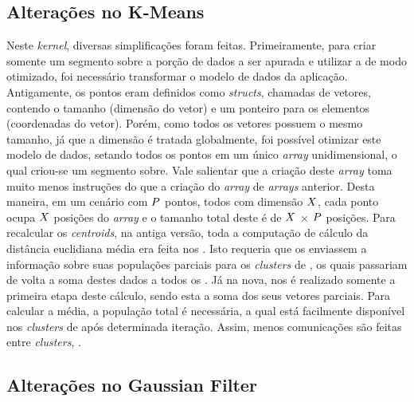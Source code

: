 \documentclass[a4paper,11pt]{article}
\begin{document}
\subsection{Alterações no K-Means}

Neste \textit{kernel}, diversas simplificações foram feitas. Primeiramente, para criar somente um segmento sobre a porção de dados a ser apurada e utilizar a \async de modo otimizado, foi necessário transformar o modelo de dados da aplicação. Antigamente, os pontos eram definidos como \textit{structs}, chamadas de vetores, contendo o tamanho (dimensão do vetor) e um ponteiro para os elementos (coordenadas do vetor). Porém, como todos os vetores possuem o mesmo tamanho, já que a dimensão é tratada globalmente, foi possível otimizar este modelo de dados, setando todos os pontos em um único \textit{array} unidimensional, o qual criou-se um segmento sobre. Vale salientar que a criação deste \textit{array} toma muito menos instruções do que a criação do \textit{array} de \textit{arrays} anterior. Desta maneira, em um cenário com $\mathnormal{P}$ pontos, todos com dimensão $\mathnormal{X}$, cada ponto ocupa $\mathnormal{X}$ posições do \textit{array} e o tamanho total deste é de $\mathnormal{X}$ $\times$ $\mathnormal{P}$ posições. Para recalcular os \textit{centroids}, na antiga versão, toda a computação de cálculo da distância euclidiana média era feita nos \ccs. Isto requeria que os \ccs enviassem a informação sobre suas populações parciais para os \textit{clusters} de \io, os quais passariam de volta a soma destes dados a todos os \ccs. Já na nova, nos \ccs é realizado somente a primeira etapa deste cálculo, sendo esta a soma dos seus vetores parciais. Para calcular a média, a população total é necessária, a qual está facilmente disponível nos \textit{clusters} de \io após determinada iteração. Assim, menos comunicações são feitas entre \textit{clusters}, .

\subsection{Alterações no Gaussian Filter}
\end{document}
